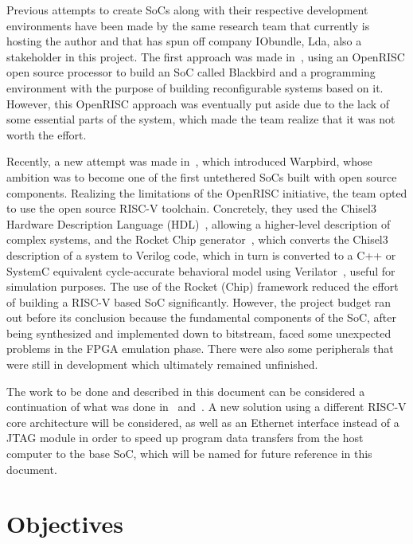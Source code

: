 Previous attempts to create SoCs along with their respective development
environments have been made by the same research team that currently is hosting 
the author and that has spun off company IObundle, Lda, also a stakeholder in this 
project. The first approach was made in~\cite{bib:blackbird}, using an OpenRISC open 
source processor to build an SoC called Blackbird and a programming environment with
the purpose of building reconfigurable systems based on it. However, this
OpenRISC approach was eventually put aside due to the lack of some essential
parts of the system, which made the team realize that it was not worth the
effort.

Recently, a new attempt was made in~\cite{bib:warpbird}, which introduced Warpbird,
whose ambition was to become one of the first untethered SoCs built with open
source components. Realizing the limitations of the OpenRISC initiative, the
team opted to use the open source RISC-V toolchain. Concretely, they used the
Chisel3 Hardware Description Language (HDL)~\cite{bib:chisel3}, allowing
a higher-level description of complex systems, and the Rocket Chip
generator~\cite{bib:rocketchip}, which converts the Chisel3 description of a
system to Verilog code, which in turn is converted to a C++ or SystemC
equivalent cycle-accurate behavioral model using Verilator~\cite{bib:verilator},
useful for simulation purposes. The use of the Rocket (Chip) framework reduced
the effort of building a RISC-V based SoC significantly. However, the project
budget ran out before its conclusion because the fundamental components of the
SoC, after being synthesized and implemented down to bitstream, faced some
unexpected problems in the FPGA emulation phase. There were also some
peripherals that were still in development which ultimately remained unfinished.

The work to be done and described in this document can be considered a
continuation of what was done in~\cite{bib:blackbird} and~\cite{bib:warpbird}. A
new solution using a different RISC-V core architecture will be considered, as
well as an Ethernet interface instead of a JTAG module in order to speed up
program data transfers from the host computer to the base SoC, which will be
named \socname for future reference in this document.


\section{Objectives}
\label{section:objectives}

